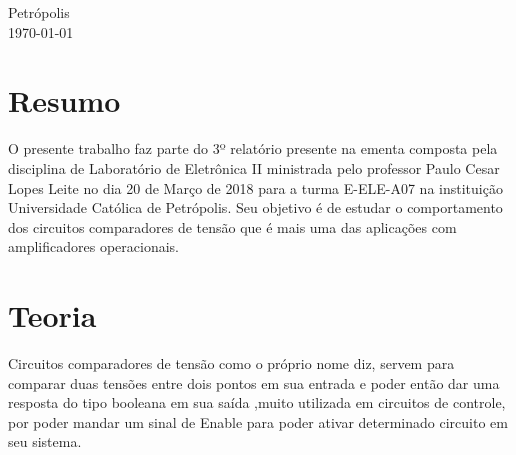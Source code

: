 \documentclass[11pt]{article}
\begin{document}
\begin{titlepage}
	
	
	\vfill\vfill\vfill %
	Petrópolis\\
	{\large\today} %
	
	
	 
	
	\vfill %
	
\end{titlepage}
\newpage

\tableofcontents
\newpage
\section{Resumo}
O presente trabalho faz parte do 3º relatório presente na ementa composta pela disciplina de Laboratório de Eletrônica II ministrada pelo professor  Paulo Cesar Lopes Leite no dia 20 de Março de 2018 
para a turma E-ELE-A07 na instituição 
Universidade Católica de Petrópolis. Seu objetivo é de estudar o comportamento dos circuitos comparadores de tensão que é mais uma das aplicações com amplificadores operacionais.
\newpage
\section{Teoria}
Circuitos comparadores de tensão como o próprio nome diz, servem para comparar duas tensões entre dois pontos em sua entrada e poder então dar uma resposta do tipo booleana em sua saída ,muito utilizada em circuitos de controle, por poder mandar um sinal de Enable para poder ativar determinado circuito em seu sistema.
\end{document}

